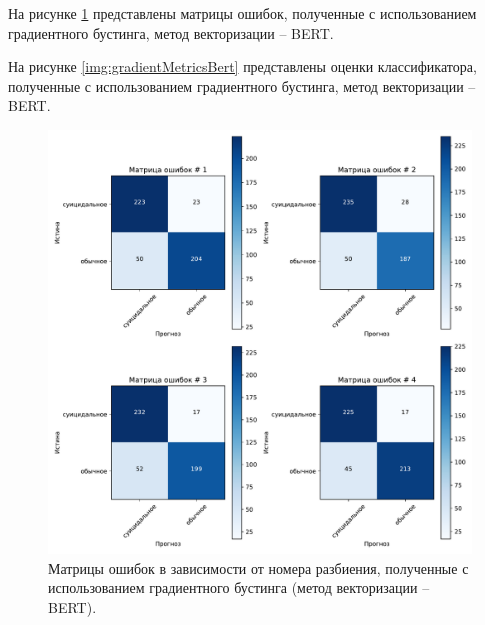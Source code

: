 На рисунке \ref{img:gradientMatrBert} представлены матрицы ошибок, полученные с использованием градиентного бустинга, метод векторизации -- BERT.

На рисунке \ref{img:gradientMetricsBert} представлены оценки классификатора, полученные с использованием градиентного бустинга, метод векторизации -- BERT.

\begin{figure}[H]
	\centering
	\includegraphics[width=\textwidth]{inc/plots/gradientMatrBert.pdf}
	\caption{ Матрицы ошибок в зависимости от номера разбиения, полученные с использованием градиентного бустинга (метод векторизации -- BERT). }
	\label{img:gradientMatrBert}
\end{figure}

